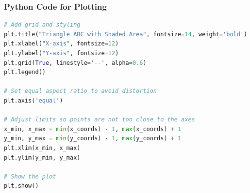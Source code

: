 \documentclass{beamer}
\theoremstyle{remark}
\numberwithin{equation}{section}
\begin{document}
\begin{frame}[fragile]
\frametitle{Python Code for Plotting}
\begin{lstlisting}[language=Python]
# Add grid and styling
plt.title("Triangle ABC with Shaded Area", fontsize=14, weight='bold')
plt.xlabel("X-axis", fontsize=12)
plt.ylabel("Y-axis", fontsize=12)
plt.grid(True, linestyle='--', alpha=0.6)
plt.legend()

# Set equal aspect ratio to avoid distortion
plt.axis('equal')

# Adjust limits so points are not too close to the axes
x_min, x_max = min(x_coords) - 1, max(x_coords) + 1
y_min, y_max = min(y_coords) - 1, max(y_coords) + 1
plt.xlim(x_min, x_max)
plt.ylim(y_min, y_max)

# Show the plot
plt.show()

\end{lstlisting}
\end{frame}
\end{document}
